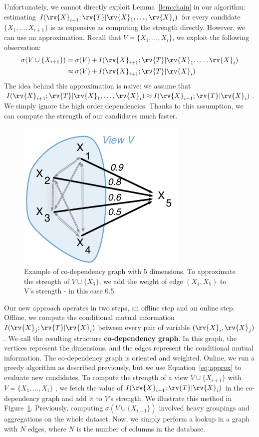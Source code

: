 Unfortunately, we cannot directly exploit Lemma~\ref{lem:chain} in our
algorithm: estimating $I(\rv{X}_{i+1} ; \rv{T} | \rv{X}_1 , \ldots, \rv{X}_i)$
for every candidate $\{X_1, \ldots, X_{i+1}\}$ is as expensive as computing
the strength directly.  However, we can use an approximation.
Recall that $V = \{X_1, \ldots, X_i\}$, we exploit the following observation:
\begin{equation}\label{eq:approx}
\begin{split}
    \sigma(V \cup \{X_{i+1}\}) & = \sigma(V)   + I(\rv{X}_{i+1} ; \rv{T} |
    \rv{X}_1, \ldots, \rv{X}_{i})\\
    & \approx \sigma(V) + I(\rv{X}_{i+1} ; \rv{T} | \rv{X}_{i})
\end{split}
\end{equation}
The idea behind this approximation is naive: we assume that $I(\rv{X}_{i+1} ;
\rv{T} | \rv{X}_1, \ldots, \rv{X}_{i}) \approx I(\rv{X}_{i+1} ; \rv{T} |
\rv{X}_{i})$. We simply ignore the high order dependencies. Thanks to this
assumption, we can compute the strength of our candidates much faster. 

\begin{figure}[t!]
\centering
\includegraphics[width=0.45\columnwidth]{images/codependency}
\caption{Example of co-dependency graph with 5 dimensions. To approximate the
strength of $V \cup \{X_5\}$, we add the weight of edge $(X_4, X_5)$ to V's
strength -  in this case 0.5.}
\label{pic:codependency}
\end{figure}
Our new approach operates in two steps, an offline step and an online step.
Offline, we compute the conditional mutual information  $ I(\rv{X}_j ; \rv{T} |
\rv{X}_i)$ between every pair of variable $(\rv{X}_i, \rv{X}_j)$. We call the
resulting structure \textbf{co-dependency graph}. In this graph, the vertices
represent the dimensions, and the edges represent the conditional mutual
information. The co-dependency graph is oriented and weighted.  Online, we run
a greedy algorithm as described previously, but we use Equation~\ref{eq:approx}
to evaluate new candidates.  To compute the strength of a view $V \cup
\{X_{i+1}\}$ with  $V= \{X_1, \ldots, X_i\}$ , we fetch the value of  $
I(\rv{X}_{i+1} ; \rv{T} | \rv{X}_i)$ in the co-dependency graph and add it to
$V$'s strength. We illustrate this method in Figure~\ref{pic:codependency}.
Previously, computing $\sigma(V \cup \{X_{i+1}\})$ involved heavy groupings and
aggregations on the whole dataset.  Now, we simply perform a lookup in a graph
with $N$ edges, where $N$ is the number of columns in the database.

